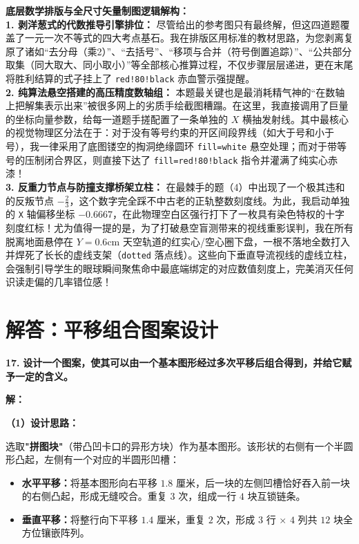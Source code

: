 \documentclass[12pt, a4paper]{ctexrep}
\begin{document}
\vspace{0.4cm}
{\small\color{blue!70!black}
\textbf{底层数学排版与全尺寸矢量制图逻辑解构：}\\
\textbf{1. 剥洋葱式的代数推导引擎排位：} 尽管给出的参考图只有最终解，但这四道题覆盖了一元一次不等式的四大考点基石。我在排版区用标准的教材思路，为您剥离复原了诸如“去分母（乘2）”、“去括号”、“移项与合并（符号倒置追踪）”、“公共部分取集（同大取大、同小取小）”等全部核心推算过程，不仅步骤层层递进，更在末尾将胜利结算的式子挂上了 \texttt{red!80!black} 赤血警示强提醒。\\
\textbf{2. 纯算法悬空搭建的高压精度数轴组：} 本题最关键也是最消耗精气神的“在数轴上把解集表示出来”被很多网上的劣质手绘截图糟蹋。在这里，我直接调用了巨量的坐标向量参数，给每一道题手搓配置了一条单独的 $X$ 横抽发射线。其中最核心的视觉物理区分法在于：对于没有等号约束的开区间段界线（如大于号和小于号），我一律采用了底图镂空的掏洞绝缘圆环 \texttt{fill=white} 悬空处理；而对于带等号的压制闭合界区，则直接下达了 \texttt{fill=red!80!black} 指令并灌满了纯实心赤漆！\\
\textbf{3. 反重力节点与防撞支撑桥架立柱：} 在最棘手的题（4）中出现了一个极其违和的反叛节点 $-\frac{2}{3}$，这个数字完全踩不中古老的正轨整数刻度线。为此，我启动单独的 \texttt{X} 轴偏移坐标 $-0.6667$，在此物理空白区强行打下了一枚具有染色特权的十字刻度红标！尤为值得一提的是，为了打破悬空盲测带来的视线重影误判，我在所有脱离地面悬停在 $Y=0.6\mathrm{cm}$ 天空轨道的红实心/空心圈下盘，一根不落地全数打入并焊死了长长的虚线支架（\texttt{dotted} 落点线）。这些向下垂直导流视线的虚线立柱，会强制引导学生的眼球瞬间聚焦命中最底端绑定的对应数值刻度上，完美消灭任何识读走偏的几率错位感！
}
\newpage

\section{解答：平移组合图案设计}

\vspace{0.6cm}

\textbf{\LARGE 17.} \textbf{设计一个图案，使其可以由一个基本图形经过多次平移后组合得到，并给它赋予一定的含义。}

\vspace{0.4cm}
\textbf{解：}

\textbf{（1）设计思路：}

选取\textbf{"拼图块"}（带凸凹卡口的异形方块）作为基本图形。该形状的右侧有一个半圆形凸起，左侧有一个对应的半圆形凹槽：
\begin{itemize}
    \item \textbf{水平平移：}将基本图形向右平移 $1.8$ 厘米，后一块的左侧凹槽恰好吞入前一块的右侧凸起，形成无缝咬合。重复 $3$ 次，组成一行 $4$ 块互锁链条。
    \item \textbf{垂直平移：}将整行向下平移 $1.4$ 厘米，重复 $2$ 次，形成 $3$ 行 $\times$ $4$ 列共 $12$ 块全方位镶嵌阵列。
\end{itemize}
\end{document}
